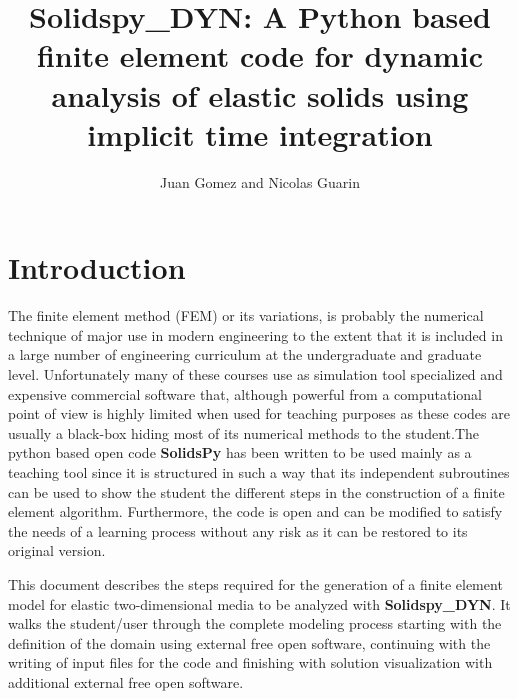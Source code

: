 \documentclass[11pt,letterpaper]{article}
\title{\textbf{Solidspy\_DYN}: A Python based finite element code for dynamic analysis of elastic solids using implicit time integration}
\date{}
\author{Juan Gomez and Nicolas Guarin}
\begin{document}
\maketitle


\section{Introduction}
The finite element method (FEM) or its variations, is probably the numerical technique of major use in modern engineering to the extent that it is included in a large number of engineering curriculum at the undergraduate and graduate level. Unfortunately many of these courses use as simulation tool specialized and expensive commercial software that, although powerful from a computational point of view is highly limited when used for teaching purposes as these codes are usually a black-box hiding most of its numerical methods to the student.The python based open code {\bf SolidsPy} has been written to be used mainly as a teaching tool since it is structured in such a way that its independent subroutines can be used to show the student the different steps in the  construction of a finite element algorithm. Furthermore, the code is open and can be modified to satisfy the needs of a learning process without any risk as it can be restored to its original version.

This document describes the steps required for the generation of a finite element model for elastic two-dimensional media to be analyzed with {\bf Solidspy\_DYN}. It walks the student/user through the complete modeling process starting with the definition of the domain using external free open software, continuing with the writing of input files for the code and finishing with solution visualization with additional external free open software.
\end{document}
